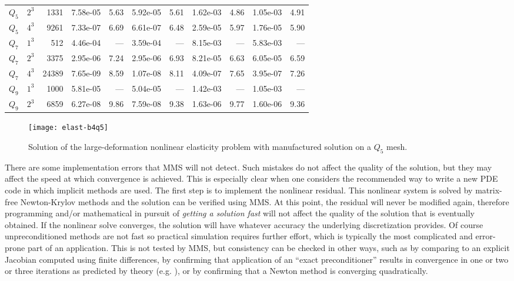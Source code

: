 \begin{table}
\begin{tabular}{lrr|rr|rr|rr|rr}
$Q_5$ & $2^3$ & 1331 & 7.58e-05 & 5.63 & 5.92e-05 & 5.61 & 1.62e-03 & 4.86 & 1.05e-03 & 4.91 \\
$Q_5$ & $4^3$ & 9261 & 7.33e-07 & 6.69 & 6.61e-07 & 6.48 & 2.59e-05 & 5.97 & 1.76e-05 & 5.90\\
\hline
$Q_7$ & $1^3$ & 512 & 4.46e-04 & --- & 3.59e-04 & --- & 8.15e-03 & --- & 5.83e-03 & --- \\
$Q_7$ & $2^3$ & 3375 & 2.95e-06 & 7.24 & 2.95e-06 & 6.93 & 8.21e-05 & 6.63 & 6.05e-05 & 6.59 \\
$Q_7$ & $4^3$ & 24389 & 7.65e-09 & 8.59 & 1.07e-08 & 8.11 & 4.09e-07 & 7.65 & 3.95e-07 & 7.26\\
\hline
$Q_9$ & $1^3$ & 1000 & 5.81e-05 & --- & 5.04e-05 & --- & 1.42e-03 & --- & 1.05e-03 & --- \\
$Q_9$ & $2^3$ & 6859 & 6.27e-08 & 9.86 & 7.59e-08 & 9.38 & 1.63e-06 & 9.77 & 1.60e-06 & 9.36
  \end{tabular}
\end{table}

\begin{figure}
  \centering\texttt{[image: elast-b4q5]}
  \caption{Solution of the large-deformation nonlinear elasticity problem with manufactured solution on a $Q_5$ mesh.}\label{fig:elastexact}
\end{figure}

There are some implementation errors that MMS will not detect.
Such mistakes do not affect the quality of the solution, but they may affect the speed at which convergence is achieved.
This is especially clear when one considers the recommended way to write a new PDE code in which implicit methods are used.
The first step is to implement the nonlinear residual.
This nonlinear system is solved by matrix-free Newton-Krylov methods and the solution can be verified using MMS.
At this point, the residual will never be modified again, therefore programming and/or mathematical in pursuit of \emph{getting a solution fast} will not affect the quality of the solution that is eventually obtained.
If the nonlinear solve converges, the solution will have whatever accuracy the underlying discretization provides.
Of course unpreconditioned methods are not fast so practical simulation requires further effort, which is typically the most complicated and error-prone part of an application.
This is not tested by MMS, but consistency can be checked in other ways, such as by comparing to an explicit Jacobian computed using finite differences, by confirming that application of an ``exact preconditioner'' results in convergence in one or two or three iterations as predicted by theory (e.g. \cite{murphy2000npi,ipsen2001note}), or by confirming that a Newton method is converging quadratically.

